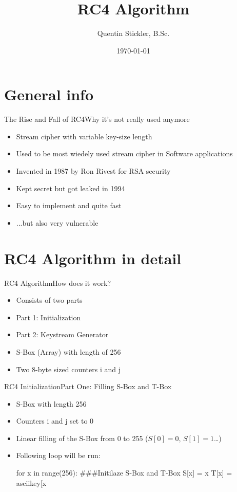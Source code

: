 \documentclass[
	aspectratio=169,	%
	onlytextwidth,		%
	t,					%
	]{beamer}
\title[RC4-Algorithmus]{RC4 Algorithm}
\author[Quentin Stickler]{Quentin Stickler, B.Sc.}
\date{\today} %
\begin{document}
\section{General info}

\begin{frame}[fragile]{The Rise and Fall of RC4}{Why it's not really used anymore}
	\begin{itemize}
		\item Stream cipher with variable key-size length
		\item Used to be most wiedely used stream cipher in Software applications
		\item Invented in 1987 by Ron Rivest for RSA security
		\item Kept secret but got leaked in 1994
		\item Easy to implement and quite fast
		\item ...but also very vulnerable
		
	\end{itemize}
\end{frame}

\section{RC4 Algorithm in detail}

\begin{frame}[fragile]{RC4 Algorithm}{How does it work?}
	\begin{itemize}
		\item Consists of two parts
		\item Part 1: Initialization
		\item Part 2: Keystream Generator
		\item S-Box (Array) with length of 256
		\item Two 8-byte sized counters i and j
	\end{itemize}
\end{frame}

\begin{frame}[fragile]{RC4 Initialization}{Part One: Filling S-Box and T-Box}
	\begin{itemize}
		\item S-Box with length 256
		\item Counters i and j set to 0
		\item Linear filling of the S-Box from 0 to 255 ($S[0] = 0$, $S[1] = 1$\dots)
		\item Following loop will be run:

		\begin{python}
			for x in range(256):		###Initilaze S-Box and T-Box
			S[x] = x
			T[x] = asciikey[x %
		\end{python}
		
	\end{itemize}
\end{frame}
\end{document}
